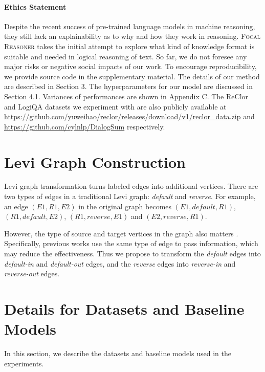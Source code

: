\documentclass[11pt]{article}
\begin{document}
\paragraph{Ethics Statement} Despite the recent success of pre-trained language models in machine reasoning, they still lack an explainability as to why and how they work in reasoning. \textsc{Focal Reasoner} takes the initial attempt to explore what kind of knowledge format is suitable and needed in logical reasoning of text. So far, we do not foresee any major risks or negative social impacts of our work. To encourage reproducibility, we provide source code in the supplementary material. The details of our method are described in Section 3. The hyperparameters for our model are discussed in Section 4.1. Variances of performances are shown in Appendix C. The ReClor and LogiQA datasets we experiment with are also publicly available at \url{https://github.com/yuweihao/reclor/releases/download/v1/reclor_data.zip} and \url{https://github.com/cylnlp/DialogSum} respectively. 




\appendix
\onecolumn
\section{Levi Graph Construction} \label{edge_type}

Levi graph transformation turns labeled edges into additional vertices. There are two types of edges in a traditional Levi graph: \textit{default} and \textit{reverse}. For example, an edge $(E1, R1, E2)$ in the original graph becomes $(E1, default, R1)$, $(R1, default, E2)$, $(R1, reverse, E1)$ and $(E2, reverse, R1)$.

However, the type of source and target vertices in the graph also matters \citep{beck2018graph}. Specifically, previous works use the same type of edge to pass information, which may reduce the effectiveness. Thus we propose to transform the \textit{default} edges into \textit{default-in} and \textit{default-out} edges, and the \textit{reverse} edges into \textit{reverse-in} and \textit{reverse-out} edges.

\section{Details for Datasets and Baseline Models}\label{detail_datasets}

In this section, we describe the datasets and baseline models used in the experiments.
\end{document}
